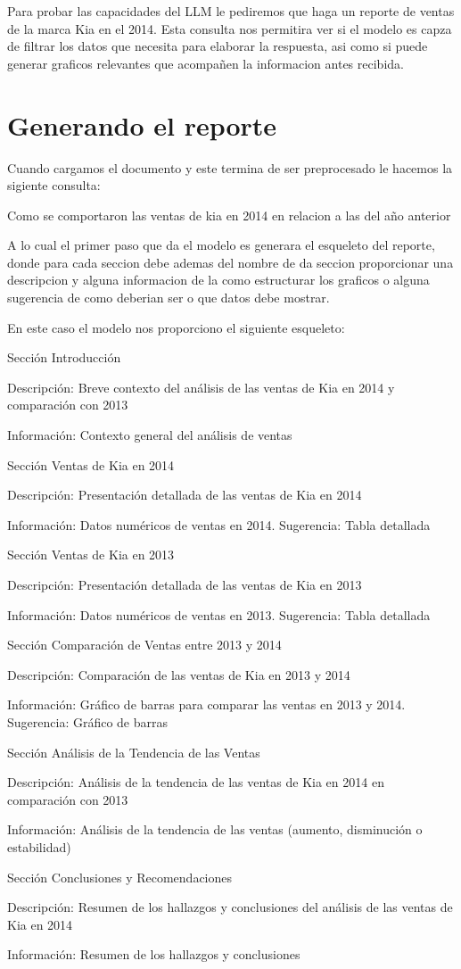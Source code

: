 Para probar las capacidades del LLM le pediremos que haga un reporte de ventas de la marca Kia en el 2014. Esta consulta nos permitira ver si el modelo es capza de filtrar los datos que necesita para elaborar la respuesta, asi como si puede generar graficos relevantes que acompañen la informacion antes recibida.

\section{Generando el reporte}
Cuando cargamos el documento y este termina de ser preprocesado le hacemos la sigiente consulta:

Como se comportaron las ventas de kia en 2014 en relacion a las del año anterior

A lo cual el primer paso que da el modelo es generara el esqueleto del reporte, donde para cada seccion debe ademas del nombre de da seccion proporcionar una descripcion y alguna informacion de la como estructurar los graficos o alguna sugerencia de como deberian ser o que datos debe mostrar.

En este caso el modelo nos proporciono el siguiente esqueleto:

Sección Introducción

Descripción: Breve contexto del análisis de las ventas de Kia en 2014 y comparación con 2013

Información: Contexto general del análisis de ventas

Sección Ventas de Kia en 2014

Descripción: Presentación detallada de las ventas de Kia en 2014

Información: Datos numéricos de ventas en 2014. Sugerencia: Tabla detallada

Sección Ventas de Kia en 2013

Descripción: Presentación detallada de las ventas de Kia en 2013

Información: Datos numéricos de ventas en 2013. Sugerencia: Tabla detallada

Sección Comparación de Ventas entre 2013 y 2014

Descripción: Comparación de las ventas de Kia en 2013 y 2014

Información: Gráfico de barras para comparar las ventas en 2013 y 2014. Sugerencia: Gráfico de barras

Sección Análisis de la Tendencia de las Ventas

Descripción: Análisis de la tendencia de las ventas de Kia en 2014 en comparación con 2013

Información: Análisis de la tendencia de las ventas (aumento, disminución o estabilidad)

Sección Conclusiones y Recomendaciones

Descripción: Resumen de los hallazgos y conclusiones del análisis de las ventas de Kia en 2014

Información: Resumen de los hallazgos y conclusiones